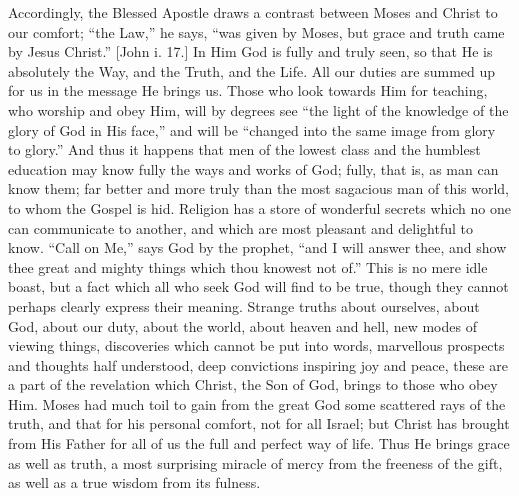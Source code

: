 Accordingly, the Blessed Apostle draws a contrast between Moses and
Christ to our comfort; ``the Law,'' he says, ``was given
by Moses, but grace and truth came by Jesus Christ.'' [John i.
17.] In Him God is fully and truly seen, so that He is absolutely the
Way, and the Truth, and the Life. All our duties are summed up for us
in the message He brings us. Those who look towards Him for teaching,
who worship and obey Him, will by degrees see ``the light of the
knowledge of the glory of God in His face,'' and will be
``changed into the same image from glory to glory.'' And thus
it happens that men of the lowest class and the humblest education may
know fully the ways and works of God; fully, that is, as man can know
them; far better and more truly than the most sagacious man of this
world, to whom the Gospel is hid. Religion has a store of wonderful
secrets which no one can communicate to another, and which are most
pleasant and delightful to know. ``Call on Me,'' says God by
the prophet, ``and I will answer thee, and show thee great and
mighty things which thou knowest not of.'' This is no mere idle
boast, but a fact which all who seek God will find to be true, though
they cannot perhaps clearly express their meaning. Strange truths
about ourselves, about God, about our duty, about the world, about
heaven and hell, new modes of viewing things, discoveries which cannot
be put into words, marvellous prospects and thoughts half understood,
deep convictions inspiring joy and peace, these are a part of the
revelation which Christ, the Son of God, brings to those who obey Him.
Moses had much toil to gain from the great God some scattered rays of
the truth, and that for his personal comfort, not for all Israel; but
Christ has brought from His Father for all of us the full and perfect
way of life. Thus He brings grace as well as truth, a most surprising
miracle of mercy from the freeness of the gift, as well as a true
wisdom from its fulness.

